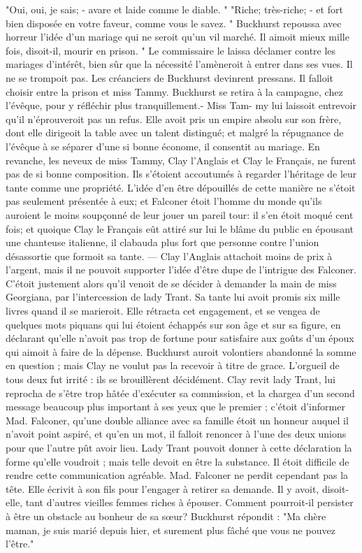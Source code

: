 "Oui, oui, je sais; - avare et laide comme le diable. "
"Riche; très-riche; - et fort bien disposée en votre faveur, comme vous le savez. "
Buckhurst repoussa avec horreur l'idée d'un mariage qui ne seroit qu'un vil marché. Il aimoit mieux mille fois, disoit-il, mourir en prison. "
Le commissaire le laissa déclamer contre les mariages d'intérêt, bien sûr que la nécessité l'amèneroit à entrer dans ses vues. Il ne se trompoit pas. Les créanciers de Buckhurst devinrent pressans. Il falloit choisir entre la prison et miss Tammy. Buckhurst se retira à la campagne, chez l'évêque, pour y réfléchir plus tranquillement.- Miss Tam-\setcounter{page}{415} my lui laissoit entrevoir qu'il n'éprouveroit pas un refus. Elle avoit pris un empire absolu sur son frère, dont elle dirigeoit la table avec un talent distingué; et malgré la répugnance de l'évêque à se séparer d'une si bonne économe, il consentit au mariage.
En revanche, les neveux de miss Tammy, Clay l'Anglais et Clay le Français, ne furent pas de si bonne composition. Ils s'étoient accoutumés à regarder l'héritage de leur tante comme une propriété. L'idée d'en être dépouillés de cette manière ne s'étoit pas seulement présentée à eux; et Falconer étoit l'homme du monde qu'ils auroient le moins soupçonné de leur jouer un pareil tour: il s'en étoit moqué cent fois; et quoique Clay le Français eût attiré sur lui le blâme du public en épousant une chanteuse italienne, il clabauda plus fort que personne contre l'union désassortie que formoit sa tante. — Clay l'Anglais attachoit moins de prix à l'argent, mais il ne pouvoit supporter l'idée d'être dupe de l'intrigue des Falconer. C'étoit justement alors qu'il venoit de se décider à demander la main de miss Georgiana, par l'intercession de lady Trant. Sa tante lui avoit promis six mille livres quand il se marieroit. Elle rétracta cet engagement, et se vengea de quelques mots piquans qui lui étoient échappés sur son âge et sur sa figure,\setcounter{page}{416} en déclarant qu’elle n’avoit pas trop de fortune pour satisfaire aux goûts d’un époux qui aimoit à faire de la dépense. Buckhurst auroit volontiers abandonné la somme en question ; mais Clay ne voulut pas la recevoir à titre de grace. L’orgueil de tous deux fut irrité : ils se brouillèrent décidément. Clay revit lady Trant, lui reprocha de s’être trop hâtée d’exécuter sa commission, et la chargea d’un second message beaucoup plus important à ses yeux que le premier ; c’étoit d’informer Mad. Falconer, qu’une double alliance avec sa famille étoit un honneur auquel il n’avoit point aspiré, et qu’en un mot, il falloit renoncer à l’une des deux unions pour que l’autre pût avoir lieu. Lady Trant pouvoit donner à cette déclaration la forme qu’elle voudroit ; mais telle devoit en être la substance.
Il étoit difficile de rendre cette communication agréable. Mad. Falconer ne perdit cependant pas la tête. Elle écrivit à son fils pour l’engager à retirer sa demande. Il y avoit, disoit-elle, tant d’autres vieilles femmes riches à épouser. Comment pourroit-il persister à être un obstacle au bonheur de sa sœur?
Buckhurst répondit : "Ma chère maman, je suis marié depuis hier, et surement plus fâché que vous ne pouvez l’être."